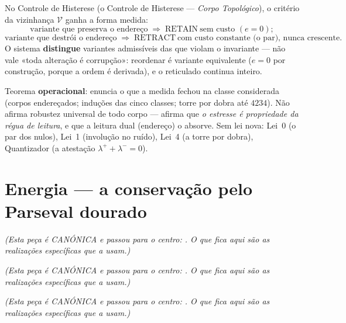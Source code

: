 \documentclass[livro.tex]{subfiles}
\begin{document}
\begin{corolario}\label{cor:variante-endereco}
No Controle de Histerese (o Controle de Histerese --- \emph{Corpo Topológico}), o
critério da vizinhança $\mathcal{V}$ ganha a forma medida:
\[
\boxed{
\text{variante que preserva o endereço}
\;\Rightarrow\;
\mathrm{RETAIN}\ \text{sem custo } (e=0);
}
\]
\[
\boxed{
\text{variante que destrói o endereço}
\;\Rightarrow\;
\mathrm{RETRACT}\ \text{com custo constante (o par), nunca crescente}.
}
\]
O sistema \textbf{distingue} variantes admissíveis das que violam o
invariante --- não vale «toda alteração é corrupção»: reordenar é
variante equivalente ($e=0$ por construção, porque a ordem é derivada), e
o reticulado continua inteiro.
\end{corolario}

\begin{observacao}[estatuto]
Teorema \textbf{operacional}: enuncia o que a medida fechou na classe
considerada (corpos endereçados; induções das cinco classes; torre
por dobra até $4234$). Não afirma robustez universal de todo corpo ---
afirma que \emph{o estresse é propriedade da régua de leitura}, e que a
leitura dual (endereço) o absorve. Sem lei nova: Lei~0 (o par dos nulos),
Lei~1 (involução no ruído), Lei~4 (a torre por dobra), Quantizador (a
atestação $\lambda^{+}+\lambda^{-}=0$).
\end{observacao}

\section{Energia --- a conservação pelo Parseval dourado}\label{sec:energia}

\noindent\emph{(Esta peça é CANÓNICA e passou para o centro: . O que fica aqui são as realizações específicas que a usam.)}


\noindent\emph{(Esta peça é CANÓNICA e passou para o centro: . O que fica aqui são as realizações específicas que a usam.)}


\noindent\emph{(Esta peça é CANÓNICA e passou para o centro: . O que fica aqui são as realizações específicas que a usam.)}
\end{document}
